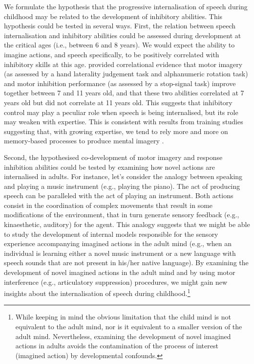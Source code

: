\documentclass[utf8]{template/frontiersSCNS} %
\begin{document}
We formulate the hypothesis that the progressive internalisation of speech during childhood may be related to the development of inhibitory abilities. This hypothesis could be tested in several ways. First, the relation between speech internalisation and inhibitory abilities could be assessed during development at the critical ages (i.e., between 6 and 8 years). We would expect the ability to imagine actions, and speech specifically, to be positively correlated with inhibitory skills at this age. \cite{wang_relationship_2021} provided correlational evidence that motor imagery (as assessed by a hand laterality judgement task and alphanumeric rotation task) and motor inhibition performance (as assessed by a stop-signal task) improve together between 7 and 11 years old, and that these two abilities correlated at 7 years old but did not correlate at 11 years old. This suggests that inhibitory control may play a peculiar role when speech is being internalised, but its role may weaken with expertise. This is consistent with results from training studies suggesting that, with growing expertise, we tend to rely more and more on memory-based processes to produce mental imagery \citep[e.g.,][]{tarr_mental_1989, jolicoeur_time_1985}.

Second, the hypothesised co-development of motor imagery and response inhibition abilities could be tested by examining how novel actions are internalised in adults. For instance, let's consider the analogy between speaking and playing a music instrument (e.g., playing the piano). The act of producing speech can be paralleled with the act of playing an instrument. Both actions consist in the coordination of complex movements that result in some modifications of the environment, that in turn generate sensory feedback (e.g., kinaesthetic, auditory) for the agent. This analogy suggests that we might be able to study the development of internal models responsible for the sensory experience accompanying imagined actions in the adult mind (e.g., when an individual is learning either a novel music instrument or a new language with speech sounds that are not present in his/her native language). By examining the development of novel imagined actions in the adult mind and by using motor interference (e.g., articulatory suppression) procedures, we might gain new insights about the internalisation of speech during childhood.\footnote{While keeping in mind the obvious limitation that the child mind is not equivalent to the adult mind, nor is it equivalent to a smaller version of the adult mind. Nevertheless, examining the development of novel imagined actions in adults avoids the contamination of the process of interest (imagined action) by developmental confounds.}
\end{document}
